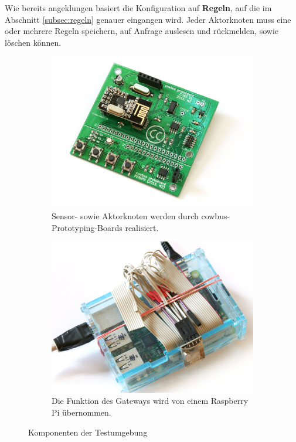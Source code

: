 \documentclass[conference]{IEEEtran}
\begin{document}
        Wie bereits angeklungen basiert die Konfiguration auf \textbf{Regeln},
        auf die im Abschnitt \ref{subsec:regeln} genauer eingangen wird.
        Jeder Aktorknoten muss eine oder mehrere Regeln speichern,
        auf Anfrage auslesen und rückmelden, sowie löschen können.

    \begin{figure}
        \centering
        \begin{subfigure}{1\columnwidth}
            \includegraphics[width=\columnwidth]{img/img-cowbus-proto}
            \caption{Sensor- sowie Aktorknoten werden durch cowbus-Prototyping-Boards realisiert.}
            \label{subfig:proto}
        \end{subfigure}\hfill
        \begin{subfigure}{1\columnwidth}
            \includegraphics[width=\columnwidth]{img/img-pi-rf}
            \caption{Die Funktion des Gateways wird von einem Raspberry Pi übernommen.}
            \label{subfig:pi}
        \end{subfigure}\hfill
        \caption{Komponenten der Testumgebung}
        \label{fig:comp}
    \end{figure}
\end{document}
